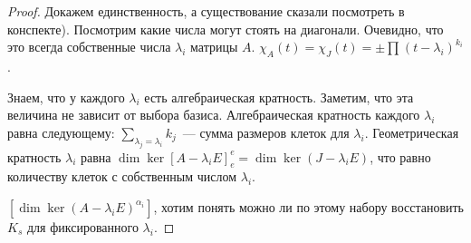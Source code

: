 \begin{proof}
    Докажем единственность, а существование сказали посмотреть в конспекте).
    Посмотрим какие числа могут стоять на диагонали. Очевидно, что это всегда собственные числа $\lambda_i$ матрицы $A$.
    $\chi_A(t) = \chi_J(t) = \pm\prod\limits_{}^{}{(t-\lambda_i)^{k_i}}$.

    Знаем, что у каждого $\lambda_i$ есть алгебраическая кратность. Заметим, что эта величина не зависит от выбора базиса.
    Алгебраическая кратность каждого $\lambda_i$ равна следующему: $\sum\limits_{\lambda_j=\lambda_i}^{}{k_j}$~--- сумма размеров
    клеток для $\lambda_i$. Геометрическая кратность $\lambda_i$  равна 
    $\dim \ker [A- \lambda_iE]^e_e = \dim \ker (J - \lambda_iE)$, что равно количеству клеток с собственным числом $\lambda_i$.

    $[\dim\ker(A - \lambda_iE)^{\alpha_i}]$, хотим понять можно ли по этому набору восстановить ${K_s}$ для 
    фиксированного $\lambda_i$.
\end{proof}
